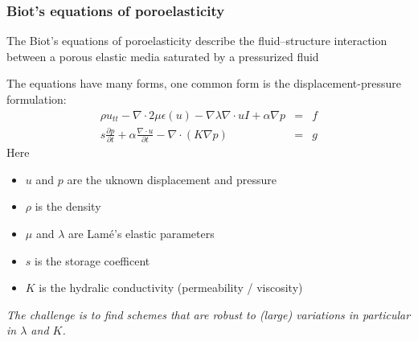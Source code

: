 \begin{frame}
\frametitle{Biot's equations of poroelasticity} 
The Biot's equations of poroelasticity describe the fluid--structure interaction
between a porous elastic media saturated  
by a pressurized fluid 

\vspace{0.3cm}
The equations have many forms, one common form is the displacement-pressure formulation: 
\begin{eqnarray*}
\rho u_{tt} - \nabla\cdot 2 \mu \epsilon(u) - \nabla \lambda \nabla \cdot u I + \alpha \nabla p &=& f \\   
s \frac{\partial p}{\partial t} + \alpha \frac{\nabla \cdot u}{\partial t} - \nabla \cdot (K \nabla p) &=& g 
\end{eqnarray*}
Here 
\begin{itemize}
\item $u$ and $p$ are the uknown displacement and pressure
\item $\rho$ is the density 
\item $\mu$ and $\lambda$ are  Lam\'{e}'s elastic parameters
\item $s$ is the storage coefficent
\item $K$ is the hydralic conductivity (permeability / viscosity) 
\end{itemize}
\emph{The challenge is to find schemes that are robust to (large) variations
in particular in $\lambda$ and $K$.} 
\end{frame}
